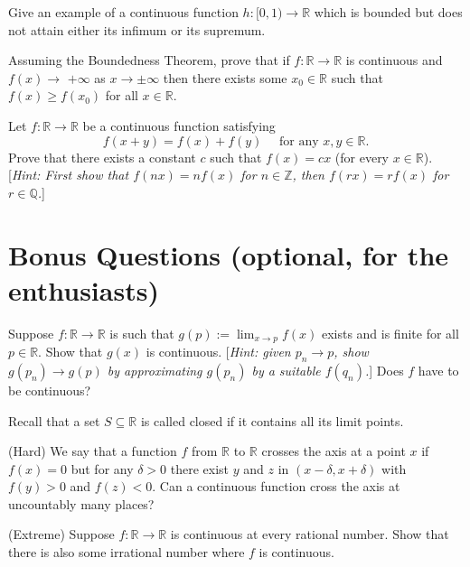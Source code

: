 \documentclass[answers]{exam}
\begin{document}
\begin{questions}
\question%
Give an example of a continuous function $h:[0,1) \to \mathbb{R}$ which is bounded but does not attain either its infimum or its supremum.



\question%
Assuming the Boundedness Theorem, prove that if $f: \mathbb{R} \to \mathbb{R}$ is continuous and $f(x) \to$ $+\infty$ as $x \to \pm \infty$ then there exists some $x_{0} \in \mathbb{R}$ such that $f(x) \geq f\left(x_{0}\right)$ for all $x \in \mathbb{R}$.



\question%
Let $f: \mathbb{R} \to \mathbb{R}$ be a continuous function satisfying \[
	f(x+y)=f(x)+f(y) \quad \text { for any } x, y \in \mathbb{R}.
\] Prove that there exists a constant $c$ such that $f(x)=c x$ (for every $x \in \mathbb{R}$). [\emph{Hint: First show that $f(n x)=n f(x)$ for $n \in \mathbb{Z}$, then $f(r x)=r f(x)$ for $r \in \mathbb{Q}$.}]



\section*{Bonus Questions (optional, for the enthusiasts)}

\question%
Suppose $f: \mathbb{R} \to \mathbb{R}$ is such that $g(p):=\lim _{x \to p} f(x)$ exists and is finite for all $p \in \mathbb{R}$. Show that $g(x)$ is continuous. [\emph{Hint: given $p_{n} \to p$, show $g\left(p_{n}\right) \to g(p)$ by approximating $g\left(p_{n}\right)$ by a suitable $f\left(q_{n}\right)$.}] Does $f$ have to be continuous?



\question%
Recall that a set $S \subseteq \mathbb{R}$ is called closed if it contains all its limit points.



\question%
(Hard) We say that a function $f$ from $\mathbb{R}$ to $\mathbb{R}$ crosses the axis at a point $x$ if $f(x)=0$ but for any $\delta>0$ there exist $y$ and $z$ in $(x-\delta, x+\delta)$ with $f(y)>0$ and $f(z)<0$. Can a continuous function cross the axis at uncountably many places?



\question%
(Extreme) Suppose $f: \mathbb{R} \to \mathbb{R}$ is continuous at every rational number. Show that there is also some irrational number where $f$ is continuous.

\end{questions}
\end{document}
